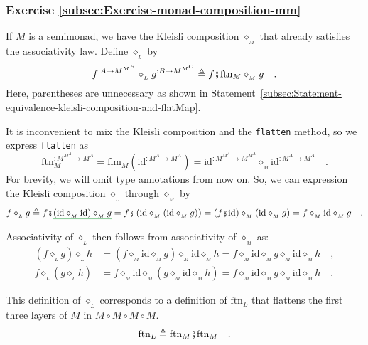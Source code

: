 \subsubsection*{Exercise \ref{subsec:Exercise-monad-composition-mm}}

If $M$ is a semimonad, we have the Kleisli composition $\diamond_{_{M}}$
that already satisfies the associativity law. Define $\diamond_{_{L}}$
by
\[
f^{:A\rightarrow M^{M^{B}}}\diamond_{_{L}}g^{:B\rightarrow M^{M^{C}}}\triangleq f\bef\text{ftn}_{M}\diamond_{_{M}}g\quad.
\]
Here, parentheses are unnecessary as shown in Statement~\ref{subsec:Statement-equivalence-kleisli-composition-and-flatMap}.

It is inconvenient to mix the Kleisli composition and the \lstinline!flatten!
method, so we express \lstinline!flatten! as
\[
\text{ftn}_{M}^{:M^{M^{A}}\rightarrow M^{A}}=\text{flm}_{M}(\text{id}^{:M^{A}\rightarrow M^{A}})=\text{id}^{:M^{M^{A}}\rightarrow M^{M^{A}}}\diamond_{_{M}}\text{id}^{:M^{A}\rightarrow M^{A}}\quad.
\]
For brevity, we will omit type annotations from now on. So, we can
expression the Kleisli composition $\diamond_{_{L}}$ through $\diamond_{_{M}}$
by
\[
f\diamond_{_{L}}g\triangleq f\bef\gunderline{\left(\text{id}\diamond_{_{M}}\text{id}\right)\diamond_{_{M}}g}=f\bef\left(\text{id}\diamond_{_{M}}\left(\text{id}\diamond_{_{M}}g\right)\right)=\left(f\bef\text{id}\right)\diamond_{_{M}}\left(\text{id}\diamond_{_{M}}g\right)=f\diamond_{_{M}}\text{id}\diamond_{_{M}}g\quad.
\]

Associativity of $\diamond_{_{L}}$ then follows from associativity
of $\diamond_{_{M}}$ as:
\begin{align*}
\left(f\diamond_{_{L}}g\right)\diamond_{_{L}}h & =\left(f\diamond_{_{M}}\text{id}\diamond_{_{M}}g\right)\diamond_{_{M}}\text{id}\diamond_{_{M}}h=f\diamond_{_{M}}\text{id}\diamond_{_{M}}g\diamond_{_{M}}\text{id}\diamond_{_{M}}h\quad,\\
f\diamond_{_{L}}\left(g\diamond_{_{L}}h\right) & =f\diamond_{_{M}}\text{id}\diamond_{_{M}}\left(g\diamond_{_{M}}\text{id}\diamond_{_{M}}h\right)=f\diamond_{_{M}}\text{id}\diamond_{_{M}}g\diamond_{_{M}}\text{id}\diamond_{_{M}}h\quad.
\end{align*}

This definition of $\diamond_{_{L}}$ corresponds to a definition
of $\text{ftn}_{L}$ that flattens the first three layers of $M$
in $M\circ M\circ M\circ M$.
\[
\text{ftn}_{L}\triangleq\text{ftn}_{M}\bef\text{ftn}_{M}\quad.
\]

